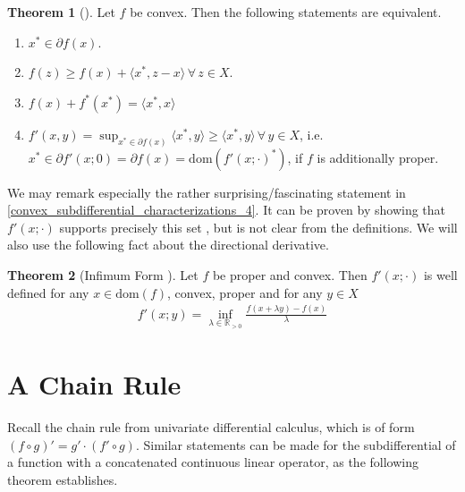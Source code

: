 \documentclass[10pt, leqno]{amsart}
\theoremstyle{definition}
\newtheorem{theorem}{Theorem}[section]
\theoremstyle{remark}
\newcommand{\draftcommentdone}{}
\begin{document}
    \begin{theorem}[{\cite[pp. 193-199]{IoffeTihomirov}}] \label{convex_subdifferential_characterizations}
        Let \(f\) be convex. Then the following statements are equivalent.
        \begin{enumerate}[label=(\roman*), wide]
            \item \(x^* \in \partial f(x)\).
            \item \(f(z) \geq f(x) + \langle x^*, z-x \rangle \, \forall \, z \in X\).
            \item \(f(x)+f^*(x^*) = \langle x^*, x \rangle\)
            \item \label{convex_subdifferential_characterizations_4} \(f'(x, y) = \sup_{x^* \in \partial f(x)} \langle x^*, y \rangle \geq \langle x^*, y \rangle \, \forall \, y \in X\), i.e. \(x^* \in \partial f'(x; 0) = \partial f(x) = \text{dom}(f'(x; \cdot)^*)\), if \(f\) is additionally proper.
        \end{enumerate}
    \end{theorem}

    We may remark especially the rather surprising/fascinating statement in  \ref{convex_subdifferential_characterizations_4}. It can be proven by showing that \(f'(x; \cdot)\) supports precisely this set \cite[p. 192, p. 196]{IoffeTihomirov}, but is not clear from the definitions. We will also use the following fact about the directional derivative.

    \begin{theorem}[{Infimum Form \cite[pp. 194-195]{IoffeTihomirov}}]
        Let \(f\) be proper and convex. Then \(f'(x; \cdot)\) is well defined for any \(x \in \text{dom}(f)\), convex, proper and for any \(y \in X\)
        \begin{align}
            f'(x; y) = \inf_{\lambda \in \mathbb{R}_{> 0}} \frac{f(x+\lambda y)-f(x)}{\lambda}
        \end{align}
    \end{theorem}



    \section{A Chain Rule \draftcommentdone} Recall the chain rule from univariate differential calculus, which is of form \((f \circ g)' = g' \cdot (f' \circ g)\). Similar statements can be made for the subdifferential of a function with a concatenated continuous linear operator, as the following theorem establishes.
\end{document}
